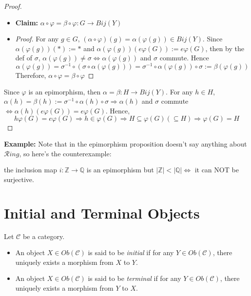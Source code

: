 \begin{proof}
    \begin{itemize}
        \item \textbf{Claim:} $\alpha \circ \varphi = \beta \circ \varphi: G \to Bij (Y)$
        \item \begin{proof}
            For any $g \in G$, $(\alpha \circ \varphi) (g) = \alpha (\varphi(g)) \in Bij(Y)$. Since $\alpha (\varphi(g))(*) := *$ and $\alpha (\varphi(g))(e\varphi(G)) := e \varphi(G)$, then by the def of $\sigma$, $\alpha(\varphi(g)) \neq \sigma \Leftrightarrow \alpha(\varphi(g))$ and $\sigma$ commute. Hence
            $$\alpha(\varphi(g)) = \sigma^{-1} \circ (\sigma \circ \alpha (\varphi(g))) = \sigma^{-1} \circ \alpha( \varphi(g)) \circ \sigma := \beta (\varphi(g))$$
            Therefore, $\alpha \circ \varphi= \beta \circ \varphi$
        \end{proof}
    \end{itemize}
    Since $\varphi$ is an epimorphism, then $\alpha = \beta : H \to Bij(Y)$. For any $h \in H$, $\alpha(h) = \beta (h) := \sigma^{-1} \circ \alpha(h) \circ \sigma \Rightarrow \alpha(h)$ and $\sigma$ commute $\Leftrightarrow \alpha(h) (e \varphi(G)) = e\varphi(G)$. Hence, 
    $$h \varphi(G) =e\varphi(G) \Rightarrow h \in \varphi(G) \Rightarrow H \subseteq \varphi(G) (\subseteq H) \Rightarrow \varphi (G)=H$$
\end{proof}

\noindent\textbf{Example:} Note that in the epimorphism proposition doesn't say anything about $\mathcal{R}ing$, so here's the counterexample:

the inclusion map $i:\mathbb{Z} \to \mathbb{Q}$ is an epimorphism but $|\mathbb{Z}| < |\mathbb{Q}| \Leftrightarrow$ it can NOT be surjective.

\section{Initial and Terminal Objects}

\begin{definition}
    Let $\mathcal{C}$ be a category.
    \begin{itemize}
        \item An object $X \in Ob(\mathcal{C})$ is said to be \textit{initial} if for any $Y \in Ob(\mathcal{C})$, there uniquely exists a morphism from $X$ to $Y$.
        \item An object $X \in Ob(\mathcal{C})$ is said to be \textit{terminal} if for any $Y \in Ob(\mathcal{C})$, there uniquely exists a morphism from $Y$ to $X$.
    \end{itemize}
\end{definition}

